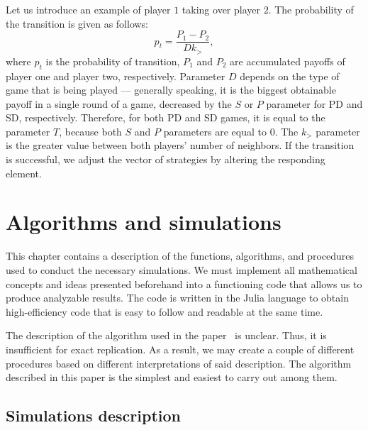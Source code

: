 \documentclass[english, twoside, 12pt, a4paper]{article}
\theoremstyle{definition}
\theoremstyle{plain}
\theoremstyle{remark}
\begin{document}
Let us introduce an example of player $1$ taking over player $2$. The probability of the transition is given as follows:
\begin{equation}\label{eq:pot}
  p_t = \frac{P_1 - P_2}{Dk_{>}},
\end{equation}
where $p_t$ is the probability of transition, $P_1$ and $P_2$ are accumulated payoffs of player one and player two, respectively. Parameter $D$ depends on the type of game that is being played --- generally speaking, it is the biggest obtainable payoff in a single round of a game, decreased by the $S$ or $P$ parameter for PD and SD, respectively. Therefore, for both PD and SD games, it is equal to the parameter $T$, because both $S$ and $P$ parameters are equal to $0$. The $k_{>}$ parameter is the greater value between both players' number of neighbors. If the transition is successful, we adjust the vector of strategies by altering the responding element. 

\clearpage
\section{Algorithms and simulations}\label{sec:alg}

This chapter contains a description of the functions, algorithms, and procedures used to conduct the necessary simulations. We must implement all mathematical concepts and ideas presented beforehand into a functioning code that allows us to produce analyzable results. The code is written in the Julia language to obtain high-efficiency code that is easy to follow and readable at the same time.

The description of the algorithm used in the paper~\cite{santos2005scale} is unclear. Thus, it is insufficient for exact replication. As a result, we may create a couple of different procedures based on different interpretations of said description. The algorithm described in this paper is the simplest and easiest to carry out among them. 

\subsection{Simulations description}
\end{document}
